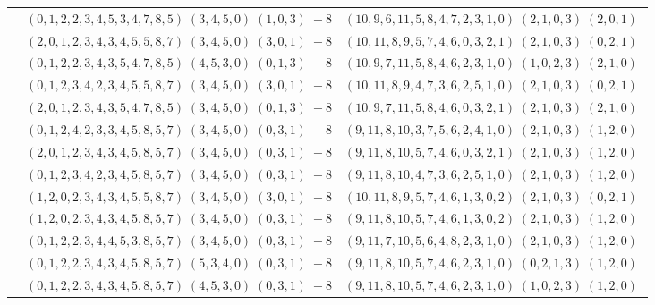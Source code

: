 \documentclass[11pt]{article}
\begin{document}
\begin{longtable}[l]{|c|c|c|}
 \cline{2-3} 
 & $(0 ,1 ,2 ,2 ,3 ,4 ,5 ,3 ,4 ,7 ,8 ,5) \;(3 ,4 ,5 ,0) \;(1 ,0 ,3) \;-8$ & $(10 ,9 ,6 ,11 ,5 ,8 ,4 ,7 ,2 ,3 ,1 ,0) \;(2 ,1 ,0 ,3) \;(2 ,0 ,1) \;$\\ 
 \cline{2-3} 
 & $(2 ,0 ,1 ,2 ,3 ,4 ,3 ,4 ,5 ,5 ,8 ,7) \;(3 ,4 ,5 ,0) \;(3 ,0 ,1) \;-8$ & $(10 ,11 ,8 ,9 ,5 ,7 ,4 ,6 ,0 ,3 ,2 ,1) \;(2 ,1 ,0 ,3) \;(0 ,2 ,1) \;$\\ 
 \cline{2-3} 
 & $(0 ,1 ,2 ,2 ,3 ,4 ,3 ,5 ,4 ,7 ,8 ,5) \;(4 ,5 ,3 ,0) \;(0 ,1 ,3) \;-8$ & $(10 ,9 ,7 ,11 ,5 ,8 ,4 ,6 ,2 ,3 ,1 ,0) \;(1 ,0 ,2 ,3) \;(2 ,1 ,0) \;$\\ 
 \cline{2-3} 
 & $(0 ,1 ,2 ,3 ,4 ,2 ,3 ,4 ,5 ,5 ,8 ,7) \;(3 ,4 ,5 ,0) \;(3 ,0 ,1) \;-8$ & $(10 ,11 ,8 ,9 ,4 ,7 ,3 ,6 ,2 ,5 ,1 ,0) \;(2 ,1 ,0 ,3) \;(0 ,2 ,1) \;$\\ 
 \cline{2-3} 
 & $(2 ,0 ,1 ,2 ,3 ,4 ,3 ,5 ,4 ,7 ,8 ,5) \;(3 ,4 ,5 ,0) \;(0 ,1 ,3) \;-8$ & $(10 ,9 ,7 ,11 ,5 ,8 ,4 ,6 ,0 ,3 ,2 ,1) \;(2 ,1 ,0 ,3) \;(2 ,1 ,0) \;$\\ 
 \cline{2-3} 
 & $(0 ,1 ,2 ,4 ,2 ,3 ,3 ,4 ,5 ,8 ,5 ,7) \;(3 ,4 ,5 ,0) \;(0 ,3 ,1) \;-8$ & $(9 ,11 ,8 ,10 ,3 ,7 ,5 ,6 ,2 ,4 ,1 ,0) \;(2 ,1 ,0 ,3) \;(1 ,2 ,0) \;$\\ 
 \cline{2-3} 
 & $(2 ,0 ,1 ,2 ,3 ,4 ,3 ,4 ,5 ,8 ,5 ,7) \;(3 ,4 ,5 ,0) \;(0 ,3 ,1) \;-8$ & $(9 ,11 ,8 ,10 ,5 ,7 ,4 ,6 ,0 ,3 ,2 ,1) \;(2 ,1 ,0 ,3) \;(1 ,2 ,0) \;$\\ 
 \cline{2-3} 
 & $(0 ,1 ,2 ,3 ,4 ,2 ,3 ,4 ,5 ,8 ,5 ,7) \;(3 ,4 ,5 ,0) \;(0 ,3 ,1) \;-8$ & $(9 ,11 ,8 ,10 ,4 ,7 ,3 ,6 ,2 ,5 ,1 ,0) \;(2 ,1 ,0 ,3) \;(1 ,2 ,0) \;$\\ 
 \cline{2-3} 
 & $(1 ,2 ,0 ,2 ,3 ,4 ,3 ,4 ,5 ,5 ,8 ,7) \;(3 ,4 ,5 ,0) \;(3 ,0 ,1) \;-8$ & $(10 ,11 ,8 ,9 ,5 ,7 ,4 ,6 ,1 ,3 ,0 ,2) \;(2 ,1 ,0 ,3) \;(0 ,2 ,1) \;$\\ 
 \cline{2-3} 
 & $(1 ,2 ,0 ,2 ,3 ,4 ,3 ,4 ,5 ,8 ,5 ,7) \;(3 ,4 ,5 ,0) \;(0 ,3 ,1) \;-8$ & $(9 ,11 ,8 ,10 ,5 ,7 ,4 ,6 ,1 ,3 ,0 ,2) \;(2 ,1 ,0 ,3) \;(1 ,2 ,0) \;$\\ 
 \cline{2-3} 
 & $(0 ,1 ,2 ,2 ,3 ,4 ,4 ,5 ,3 ,8 ,5 ,7) \;(3 ,4 ,5 ,0) \;(0 ,3 ,1) \;-8$ & $(9 ,11 ,7 ,10 ,5 ,6 ,4 ,8 ,2 ,3 ,1 ,0) \;(2 ,1 ,0 ,3) \;(1 ,2 ,0) \;$\\ 
 \cline{2-3} 
 & $(0 ,1 ,2 ,2 ,3 ,4 ,3 ,4 ,5 ,8 ,5 ,7) \;(5 ,3 ,4 ,0) \;(0 ,3 ,1) \;-8$ & $(9 ,11 ,8 ,10 ,5 ,7 ,4 ,6 ,2 ,3 ,1 ,0) \;(0 ,2 ,1 ,3) \;(1 ,2 ,0) \;$\\ 
 \cline{2-3} 
 & $(0 ,1 ,2 ,2 ,3 ,4 ,3 ,4 ,5 ,8 ,5 ,7) \;(4 ,5 ,3 ,0) \;(0 ,3 ,1) \;-8$ & $(9 ,11 ,8 ,10 ,5 ,7 ,4 ,6 ,2 ,3 ,1 ,0) \;(1 ,0 ,2 ,3) \;(1 ,2 ,0) \;$\\ 

\end{longtable}
\end{document}

